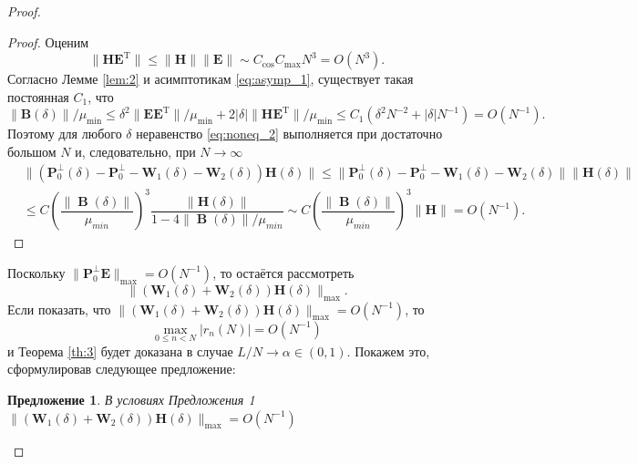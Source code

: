 \documentclass[specialist,
substylefile = spbu_report.rtx,
subf,href,colorlinks=true, 12pt]{disser}
\newcommand\norm[1]{\left\|#1\right\|}
\DeclareMathOperator\B{\mathbf{B}}
\newtheorem{sentence}{Предложение}
\begin{document}
\begin{proof}
		\begin{proof}
			Оценим 
			\begin{equation*}
				\|\mathbf{HE}^\mathrm{T}\|\leqslant\|\mathbf{H}\|\|\mathbf{E}\|\sim C_{\cos}C_{\max}N^3 = O(N^3).
			\end{equation*}
			Согласно Лемме \ref{lem:2} и асимптотикам \eqref{eq:asymp_1}, существует такая постоянная $C_1$, что
			\begin{equation*}
				\|\mathbf{B}(\delta)\|/\mu_{\min}\leqslant\delta^2\|\mathbf{EE}^\mathrm{T}\|/\mu_{\min}+2|\delta|\|\mathbf{HE}^\mathrm{T}\|/\mu_{\min}\leqslant C_1(\delta^2N^{-2}+|\delta|N^{-1})=O(N^{-1}).
			\end{equation*}
			Поэтому для любого $\delta$ неравенство \eqref{eq:noneq_2} выполняется при достаточно большом $N$ и, следовательно, при $N\rightarrow\infty$
			\begin{align*}
				&\|(\mathbf{P}_0^\bot(\delta)-\mathbf{P}_0^\bot-\mathbf{W}_1(\delta)-\mathbf{W}_2(\delta))\mathbf{H}(\delta)\|\leqslant\|\mathbf{P}_0^\bot(\delta)-\mathbf{P}_0^\bot-\mathbf{W}_1(\delta)-\mathbf{W}_2(\delta)\|\|\mathbf{H}(\delta)\|
				\\
				&\leqslant C\left(\dfrac{\norm{\B(\delta)}}{\mu_{min}}\right)^3\dfrac{\|\mathbf{H}(\delta)\|}{1-4\norm{\B(\delta)}/\mu_{min}}\sim C\left(\dfrac{\norm{\B(\delta)}}{\mu_{min}}\right)^3\|\mathbf{H}\| = O(N^{-1}).
			\end{align*}
		\end{proof}
		Поскольку $\|\mathbf{P}_0^\bot\mathbf{E}\|_{\max} = O(N^{-1})$, то остаётся рассмотреть~ \begin{equation*}
			\|(\mathbf{W}_1(\delta) + \mathbf{W}_2(\delta))\mathbf{H}(\delta)\|_{\max}. 
		\end{equation*}
		Если показать, что $\|(\mathbf{W}_1(\delta) + \mathbf{W}_2(\delta))\mathbf{H}(\delta)\|_{\max} = O(N^{-1})$, то 
		\begin{equation*}
			\max_{0\leqslant n<N}|r_n(N)|=O(N^{-1})
		\end{equation*}
		и Теорема \ref{th:3} будет доказана в случае $L/N\rightarrow\alpha\in(0,1)$.
		Покажем это, сформулировав следующее предложение:
		\begin{sentence}
			В условиях Предложения 1 $\|(\mathbf{W}_1(\delta)+\mathbf{W}_2(\delta))\mathbf{H}(\delta)\|_{\max}=O(N^{-1})$
		\end{sentence}
		

\end{proof}
\end{document}
